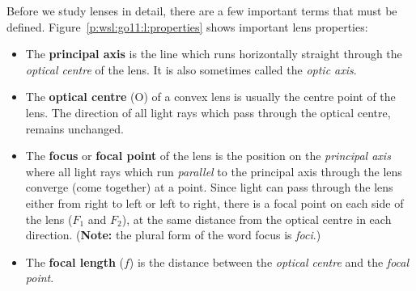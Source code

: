 Before we study lenses in detail, there are a few important terms that must be defined. Figure~\ref{p:wsl:go11:l:properties} shows important lens properties:
\begin{itemize}
\item{The \textbf{principal axis} is the line which runs horizontally straight through the \textit{optical centre} of the lens. It is also sometimes called the \textit{optic axis}.}
\item{The \textbf{optical centre} (O) of a convex lens is usually the centre point of the lens. The direction of all light rays which pass through the optical centre, remains unchanged.}
\item{The \textbf{focus} or \textbf{focal point} of the lens is
the position on the \textit{principal axis}
where all light rays which run \textit{parallel} to the principal axis through the lens converge (come together) at a point. Since light can pass through the lens either from right to left or left to right, there is a focal point on each side of the lens ($F_{1}$ and $F_{2}$), at the same distance from the optical centre in each direction. (\textbf{Note:} the plural form of the word focus is \textit{foci}.)}
\item{The \textbf{focal length} ($f$) is the distance between the \textit{optical centre} and the \textit{focal point}.}
\end{itemize}


